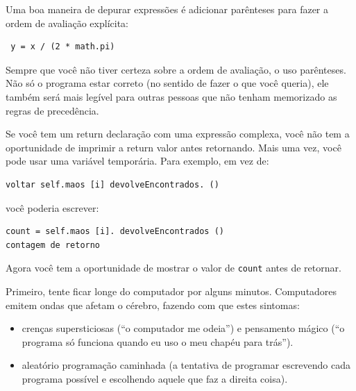 \documentclass[10pt]{book}
\begin{document}
\begin{exercise}
\begin{v erbatim}
Uma boa maneira de depurar expressões é adicionar parênteses para fazer
a ordem de avaliação explícita:

\begin{verbatim}
 y = x / (2 * math.pi)
\end{verbatim}
%
Sempre que você não tiver certeza sobre a ordem de avaliação, o uso
parênteses. Não só o programa estar correto (no sentido
de fazer o que você queria), ele também será mais legível para
outras pessoas que não tenham memorizado as regras de precedência.



Se você tem um {return \tt} declaração com uma expressão complexa,
você não tem a oportunidade de imprimir a {return \tt} valor antes
retornando. Mais uma vez, você pode usar uma variável temporária. Para
exemplo, em vez de:

\begin{verbatim}
voltar self.maos [i] devolveEncontrados. ()
\end{verbatim}
%
você poderia escrever:

\begin{verbatim}
count = self.maos [i]. devolveEncontrados ()
contagem de retorno
\end{verbatim}
%
Agora você tem a oportunidade de mostrar o valor de
{\tt count} antes de retornar.



Primeiro, tente ficar longe do computador por alguns minutos.
Computadores emitem ondas que afetam o cérebro, fazendo com que estes
sintomas:

\begin{itemize}

 item e raiva.
\index{} raiva

\item crenças supersticiosas (``o computador me odeia'') e
pensamento mágico (``o programa só funciona quando eu uso o meu
chapéu para trás'').

\item aleatório programação caminhada (a tentativa de programar escrevendo
cada programa possível e escolhendo aquele que faz a direita
coisa).


\end{itemize}
\end{v erbatim}
\end{exercise}
\end{document}
